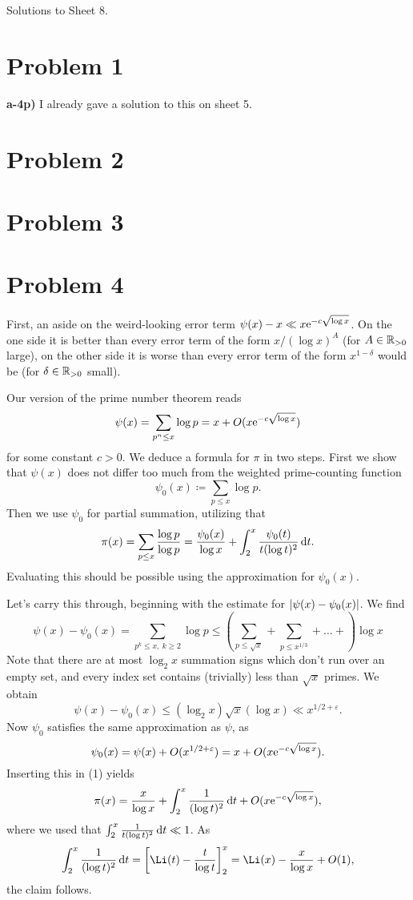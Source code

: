\documentclass[a4paper,11pt]{article}
\author{Max von Consbruch}
\begin{document}
\begin{center}
    \huge{Solutions to Sheet 8.}
\end{center}

\section*{Problem 1}
\textbf{a-4p)} I already gave a solution to this on sheet 5. 
\section*{Problem 2}
\section*{Problem 3}
\section*{Problem 4}
First, an aside on the weird-looking error term $\psi(x)-x \ll x \mathrm e^{-c
\sqrt{\log x}}$. On the one side it is better than every error term
of the form $x /(\log x)^A$ (for $A \in \mathbb{R}_{>0}$ large), on the other side 
it is worse than every error term of the form $x^{1-\delta}$ would be (for
$\delta \in \mathbb{R}_{>0}$ small).

Our version of the prime number theorem reads
\[
    \psi(x) = \sum_{p^n \leq x} \log p =  x + O(x\mathrm e^{-c \sqrt{\log x}})
\]
for some constant $c > 0$. We deduce a formula for $\pi$ in two steps. First we show that 
$\psi(x)$ does not differ too much from the weighted prime-counting function
\[
    \psi_0(x) \coloneqq \sum_{p \leq x} \log p.
\]
Then we use $\psi_0$ for partial summation, utilizing that
\begin{equation}
    \pi(x) = \sum_{p \leq x} \frac{\log p}{\log p} = \frac {\psi_0(x)}{\log x}
    + \int_2^x \frac{\psi_0(t)}{t (\log t)^2} \mathrm{\,d} t.
\end{equation}
Evaluating this should be possible using the approximation for $\psi_0(x)$. 

Let's carry this through, beginning with the estimate for $\left\lvert \psi(x)-\psi_0(x) \right\rvert$. 
We find
\[
    \psi(x)-\psi_0(x) = \sum_{p^k \leq x, \ k \geq 2} \log p
    \leq \left(\sum_{p \leq \sqrt x} + \sum_{p \leq x^{1/3}} + \dots + 
    \right) \log x
\]
Note that there are at most $\log_2 x$ summation signs which don't run over an
empty set,
and every index set contains (trivially) less than $\sqrt x$ primes. We obtain
\[
    \psi(x) - \psi_0(x) \leq  (\log_2 x) \sqrt x (\log x) \ll x^{1/2+\varepsilon}.
\]
Now $\psi_0$ satisfies the same approximation as $\psi$, as
\[
    \psi_0(x) = \psi(x) + O(x^{1/2+\varepsilon}) = x + O(x \mathrm e^{-c \sqrt {\log x}}).
\]
Inserting this in (1) yields
\[
    \pi(x) = \frac x{\log x} + \int_2^x \frac{1}{(\log t)^2} \mathrm{\,d} t
    + O( x \mathrm e^{-c \sqrt{\log x}}),
\]
where we used that $\int_2^x \frac{1}{t (\log t)^2} \mathrm{\,d} t \ll 1$. As
\[
    \int_2^x \frac{1}{(\log t)^2} \dc t = \left[ \Li(t)-\frac t{\log t} \right]_2^x
    = \Li(x) - \frac{x}{\log x} + O(1),
\]
the claim follows. 



\contactend
\end{document}
